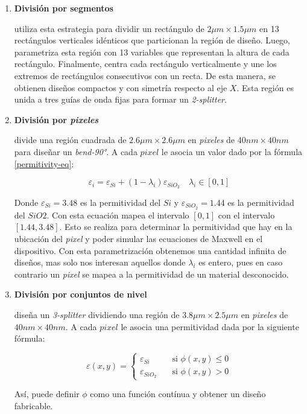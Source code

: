 \begin{enumerate}

  \item \textbf{División por segmentos}

  \cite{Prosopio-Galarza2019} utiliza esta estrategia para dividir un rectángulo de $2\mu m \times 1.5 \mu m$ en 13 rectángulos verticales idénticos que particionan la región de diseño.
    Luego, parametriza esta región con 13 variables que representan la altura de cada rectángulo. 
    Finalmente, centra cada rectángulo verticalmente y une los extremos de rectángulos consecutivos con un recta. 
    De esta manera, se obtienen diseños compactos y con simetría respecto al eje $X$.
    Esta región es unida a tres guías de onda fijas para formar un \emph{2-splitter}.

  \item \textbf{División por \emph{pixeles}}

    \cite{Su2020} divide una región cuadrada de $2.6 \mu m \times 2.6 \mu m$ en \emph{pixeles} de $40 nm \times 40 nm$ para diseñar un \emph{bend-90°}. 
    A cada $pixel$ le asocia un valor dado por la fórmula \ref{permitivity-eq}:

  \begin{equation}
    \varepsilon_i = \varepsilon_{Si} + (1 - \lambda_i) \varepsilon_{SiO_2} \quad \lambda_i \in [0, 1]
  \label{permitivity-eq}
  \end{equation}

  Donde $\varepsilon_{Si} = 3.48$ es la permitividad del $Si$ y $\varepsilon_{SiO_2} = 1.44$ es la permitividad del $SiO2$.
  Con esta ecuación \citet{Su2020} mapea el intervalo $[0, 1]$ con el intervalo $[1.44, 3.48]$. 
  Esto se realiza para determinar la permitividad que hay en la ubicación del \emph{pixel} y poder simular las ecuaciones de Maxwell en el dispositivo.
  Con esta parametrización obtenemos una cantidad infinita de diseños, mas solo nos interesan aquellos donde $\lambda_i$ es entero, pues en caso contrario un \emph{pixel} se mapea a la permitividad de un material desconocido.
  

  \item \textbf{División por conjuntos de nivel}

    \cite{Piggott2017} diseña un \emph{3-splitter} dividiendo una región de $3.8 \mu m \times 2.5 \mu m$ en \emph{pixeles} de $40 nm \times 40 nm$. A cada $pixel$ le asocia una permitividad dada por la siguiente fórmula:

  \[ \varepsilon(x, y) =
    \begin{cases}
      \varepsilon_{Si}       & \quad \text{si } \phi(x, y) \leq 0\\
      \varepsilon_{SiO_2}    & \quad \text{si } \phi(x, y) > 0
    \end{cases}
  \]

  Así, \cite{Piggott2017} puede definir $\phi$ como una función contínua y obtener un diseño fabricable.



\end{enumerate}

